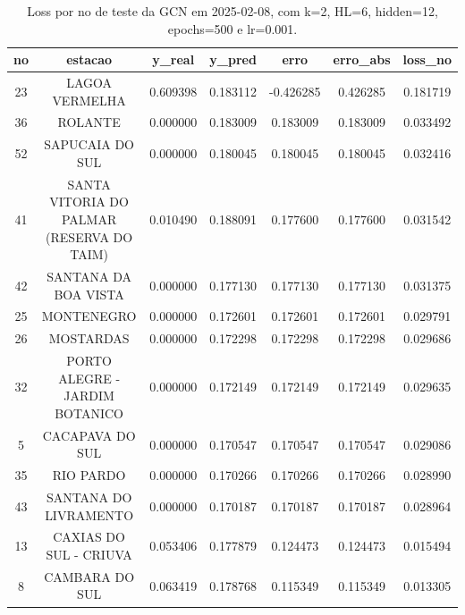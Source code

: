 \begin{table}[h]
\centering
\caption{Loss por no de teste da GCN em 2025-02-08, com k=2, HL=6, hidden=12, epochs=500 e lr=0.001.}
\label{tab:gcn_loss_k2_hl6_h12_e500_d20250208}
\begin{tabular}{ccccccc}
\toprule
no & estacao & y\_real & y\_pred & erro & erro\_abs & loss\_no \\
\midrule
23 & LAGOA VERMELHA & 0.609398 & 0.183112 & -0.426285 & 0.426285 & 0.181719 \\
36 & ROLANTE & 0.000000 & 0.183009 & 0.183009 & 0.183009 & 0.033492 \\
52 & SAPUCAIA DO SUL & 0.000000 & 0.180045 & 0.180045 & 0.180045 & 0.032416 \\
41 & SANTA VITORIA DO PALMAR (RESERVA DO TAIM) & 0.010490 & 0.188091 & 0.177600 & 0.177600 & 0.031542 \\
42 & SANTANA DA BOA VISTA & 0.000000 & 0.177130 & 0.177130 & 0.177130 & 0.031375 \\
25 & MONTENEGRO & 0.000000 & 0.172601 & 0.172601 & 0.172601 & 0.029791 \\
26 & MOSTARDAS & 0.000000 & 0.172298 & 0.172298 & 0.172298 & 0.029686 \\
32 & PORTO ALEGRE - JARDIM BOTANICO & 0.000000 & 0.172149 & 0.172149 & 0.172149 & 0.029635 \\
5 & CACAPAVA DO SUL & 0.000000 & 0.170547 & 0.170547 & 0.170547 & 0.029086 \\
35 & RIO PARDO & 0.000000 & 0.170266 & 0.170266 & 0.170266 & 0.028990 \\
43 & SANTANA DO LIVRAMENTO & 0.000000 & 0.170187 & 0.170187 & 0.170187 & 0.028964 \\
13 & CAXIAS DO SUL - CRIUVA & 0.053406 & 0.177879 & 0.124473 & 0.124473 & 0.015494 \\
8 & CAMBARA DO SUL & 0.063419 & 0.178768 & 0.115349 & 0.115349 & 0.013305 \\
\bottomrule
\end{tabular}
\end{table}
